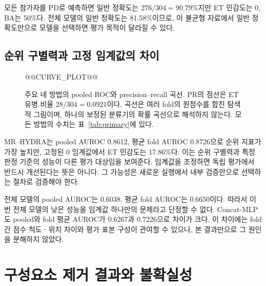 \documentclass[11pt,a4paper]{article}
\numberwithin{equation}{section}
\begin{document}
모든 참가자를 PD로 예측하면 일반 정확도는 $276/304=90.79\%$지만
ET 민감도는 0, BA는 50\%다. 전체 모델의 일반 정확도는 81.58\%이므로,
이 불균형 자료에서 일반 정확도만으로 모델을 선택하면 평가 목적이 달라질 수 있다.

\subsection{순위 구별력과 고정 임계값의 차이}
\begin{figure}[H]\centering
@@CURVE_PLOT@@
\caption{주요 네 방법의 pooled ROC와 precision--recall 곡선.
PR의 점선은 ET 유병 비율 $28/304=0.0921$이다.
곡선은 여러 fold의 원점수를 합친 탐색적 그림이며, 하나의 보정된 분류기의
확률 곡선으로 해석하지 않는다. 모든 방법의 수치는 표~\ref{tab:primary}에 있다.}
\label{fig:curves}
\end{figure}
MR--HYDRA는 pooled AUROC 0.8612, 평균 fold AUROC 0.8726으로 순위 지표가
가장 높지만, 고정된 0 임계값에서 ET 민감도는 17.86\%다.
이는 순위 구별력과 특정 판정 기준의 성능이 다른 평가 대상임을 보여준다.
임계값을 조정하면 독립 평가에서 반드시 개선된다는 뜻은 아니다.
그 가능성은 새로운 실행에서 내부 검증만으로 선택하는 절차로 검증해야 한다.

전체 모델의 pooled AUROC는 0.6038, 평균 fold AUROC는 0.6650이다.
따라서 이번 전체 모델의 낮은 성능을 임계값 하나만의 문제라고 단정할 수 없다.
Concat-MLP도 pooled와 fold 평균 AUROC가 0.6267과 0.7226으로 차이가 크다.
이 차이에는 fold 간 점수 척도ㆍ위치 차이와 평가 표본 구성이 관여할 수 있으나,
본 결과만으로 그 원인을 분해하지 않았다.

\section{구성요소 제거 결과와 불확실성}
\end{document}
